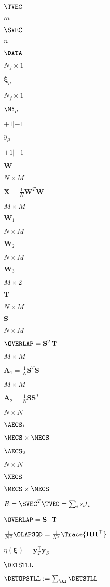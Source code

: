 $\TVEC$

$m$

$\SVEC$

$n$

$\DATA$

$N_{f}\times 1$

$\boldsymbol{{\xi}}_{\mu}$

$N_{f}\times 1$

$\MY_{\mu}$

$+1|-1$

$y_{\mu}$

$+1|-1$

$\mathbf{W}$

$N\times M$

$\mathbf{X}=\frac{1}{N}\mathbf{W}^{T}\mathbf{W}$

$M\times M$

$\mathbf{W}_{1}$

$N \times M$

$\mathbf{W}_{2}$

$N\times M$

$\mathbf{W}_{3}$

$M\times 2$

$\mathbf{T}$

$N\times M$

$\mathbf{S}$

$N\times M$

$\OVERLAP=\mathbf{S}^T\mathbf{T}$

$M\times M$

$\mathbf{A}_{1}=\tfrac{1}{N}\mathbf{S}^{T}\mathbf{S}$

$M\times M$

$\mathbf{A}_{2}=\tfrac{1}{N}\mathbf{S}\mathbf{S}^{T}$

$N\times N$

$\AECS_{1}$

$\MECS\times \MECS$

$\AECS_{2}$

$N \times N$

$\XECS$

$\MECS\times \MECS $

$R=\SVEC^{T}\TVEC=\sum_{i}s_{i}t_{i}$

$\OVERLAP=\mathbf{S}^{\top}\mathbf{T}$

$\tfrac{1}{N^2}\OLAPSQD=\tfrac{1}{N^2}\Trace{\mathbf{RR}^{\top}}$

$\eta(\boldsymbol{\xi})=\mathbf{y}^{\top}_{T}\mathbf{y}_{S}$

$\DETSTLL$

$\DETOPSTLL:=\sum_{\XI}\DETSTLL$

